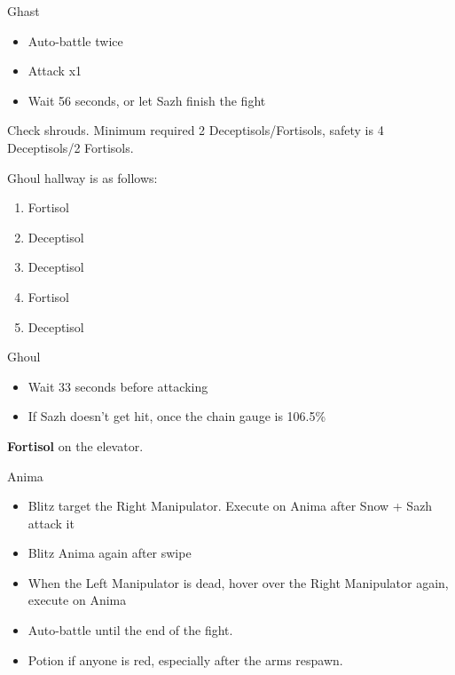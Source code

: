 \begin{multicols}{2}
\begin{battle}{Ghast}
\begin{itemize}
    \item Auto-battle twice
    \item Attack x1
    \item Wait 56 seconds, or let Sazh finish the fight
\end{itemize}
\end{battle}

Check shrouds. Minimum required 2 Deceptisols/Fortisols, safety is 4 Deceptisols/2 Fortisols.

Ghoul hallway is as follows:

\begin{enumerate}
    \item Fortisol
    \item Deceptisol
    \item Deceptisol
    \item Fortisol
    \item Deceptisol
\end{enumerate}

\begin{battle}{Ghoul}
\begin{itemize}
    \item Wait 33 seconds before attacking
    \item If Sazh doesn't get hit, once the chain gauge is 106.5\%
\end{itemize}
\end{battle}

\textbf{Fortisol} on the elevator.

\begin{battle}{Anima}
\begin{itemize}
    \item Blitz target the Right Manipulator. Execute on Anima after Snow + Sazh attack it
    \item Blitz Anima again after swipe
    \item When the Left Manipulator is dead, hover over the Right Manipulator again, execute on Anima
    \item Auto-battle until the end of the fight.
    \item Potion if anyone is red, especially after the arms respawn.
\end{itemize}
\end{battle}



\end{multicols}